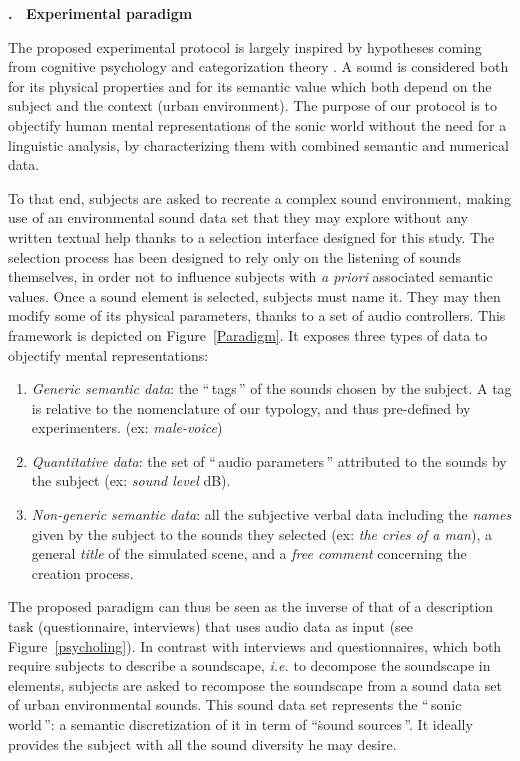 \documentclass[12pt, titlepage, reqno]{article} %
\renewcommand{\section}[1]{\medskip \addtocounter{section}{1}\raggedright 
     \textbf{\Roman{section}. \ #1}\medskip \setcounter{subsection}{0}
    \setlength{\parindent}{5ex}
 }
\begin{document}
\section{Experimental paradigm}

The proposed experimental protocol is largely inspired  by hypotheses coming from cognitive psychology\cite{dubois2000categories,dubois2006cognitive} and categorization theory \cite{roach1978cognition}. A sound is considered both for its physical properties and for its semantic value which both depend on the subject and the context (urban environment). The purpose of our  protocol is to objectify human mental representations of the sonic world without the need for a linguistic analysis, by characterizing them with combined semantic and numerical data.

To that end, subjects are asked to recreate a complex sound environment, making use of an environmental sound data set that they may explore without any written textual help thanks to a selection interface designed for this study. The selection process  has been designed to rely only on the listening of sounds themselves, in order not to influence subjects with \textit{a priori} associated semantic values. Once a sound element is selected, subjects must name it. They may then modify some of its physical parameters, thanks to a set of audio controllers.  This framework is depicted on Figure~\ref{Paradigm}. It exposes three types of data to objectify mental representations:

\begin{enumerate}
\item  \textit{Generic semantic data}: the ``\,tags\,'' of the sounds chosen by the subject. A tag is relative to the nomenclature of our typology, and thus pre-defined by experimenters. (ex: \textit{male-voice})
\item \textit{Quantitative data}: the set of ``\,audio parameters\,'' attributed to the sounds by the subject (ex: \textit{sound level} dB).
\item \textit{Non-generic semantic data}: all the subjective verbal data including  the \emph{names} given by the subject to the sounds they selected (ex: \textit{the cries of a man}), a general \emph{title} of the simulated scene, and a \emph{free comment} concerning the creation process.
\end{enumerate}

The proposed paradigm can thus be seen as the inverse of that of a description task (questionnaire, interviews) that uses audio data as input (see Figure~\ref{psycholing}). In contrast with interviews and questionnaires, which both require subjects to describe a soundscape, \textit{i.e.} to decompose the soundscape in elements, subjects are asked to recompose the soundscape from a sound data set of urban environmental sounds. This sound data set  represents the ``\,sonic world\,'': a semantic discretization of it in term of  ``\.sound sources\,''. It ideally  provides the subject with all the sound diversity he may desire. 
\end{document}
